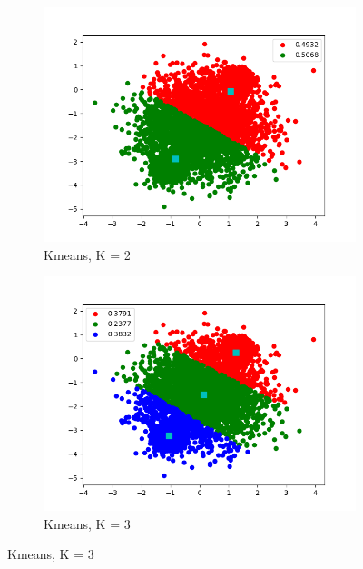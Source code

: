 \documentclass[12pt,letterpaper]{article}
\begin{document}
\begin{figure}
    \begin{subfigure}[b]{0.45\textwidth}
        \includegraphics[width=\textwidth]{imgs/kmeans_K_2.png}
        \caption{Kmeans, K = 2}
        \label{kmeans_2}
    \end{subfigure}
    \begin{subfigure}[b]{0.45\textwidth}
        \includegraphics[width=\textwidth]{imgs/kmeans_K_3.png}
        \caption{Kmeans, K = 3}
        \label{kmeans_3}
    \end{subfigure}
     

\end{figure}
\end{document}
